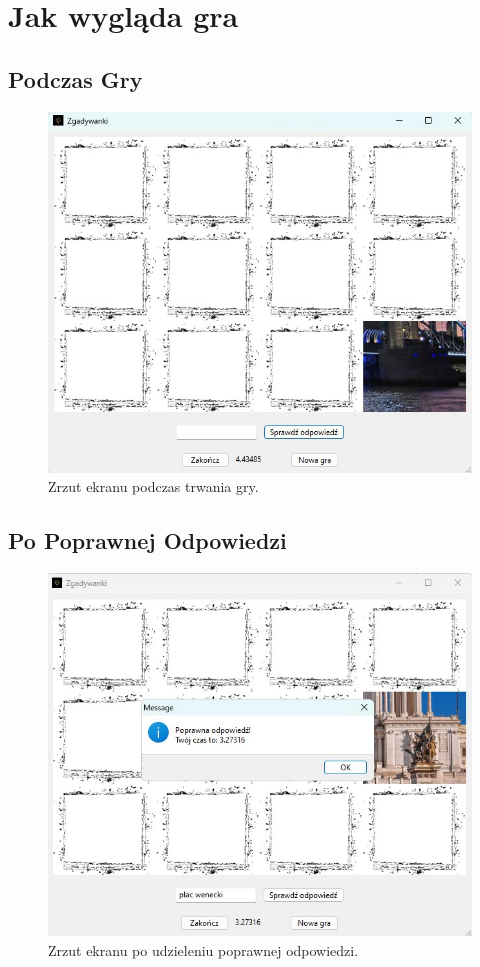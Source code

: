 \documentclass{article}
\begin{document}
	\section{Jak wygląda gra}
	
	\subsection{Podczas Gry}
	\begin{figure}[H]
		\centering
		\includegraphics[width=0.8\linewidth]{zrzut_gry.jpg}
		\caption{Zrzut ekranu podczas trwania gry.}
		\label{fig:gry}
	\end{figure}
	
	\subsection{Po Poprawnej Odpowiedzi}
	\begin{figure}[H]
		\centering
		\includegraphics[width=0.8\linewidth]{poprawna_odp.jpg}
		\caption{Zrzut ekranu po udzieleniu poprawnej odpowiedzi.}
		\label{fig:poprawna_odp}
	\end{figure}
	
\end{document}
